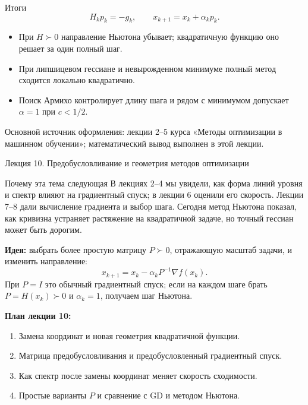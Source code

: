 \documentclass[aspectratio=169,10pt]{beamer}
\begin{document}
\begin{frame}{Итоги}
\small
\[
\boxed{H_kp_k=-g_k,\qquad x_{k+1}=x_k+\alpha_kp_k.}
\]
\begin{itemize}
\item При $H\succ0$ направление Ньютона убывает; квадратичную функцию оно решает за один полный шаг.
\item При липшицевом гессиане и невырожденном минимуме полный метод сходится локально квадратично.
\item Поиск Армихо контролирует длину шага и рядом с минимумом допускает $\alpha=1$ при $c<1/2$.
\end{itemize}
\vspace{.4em}
\footnotesize Основной источник оформления: лекции 2--5 курса «Методы оптимизации в машинном обучении»; математический вывод выполнен в этой лекции.
\end{frame}

\begin{frame}{Лекция 10. Предобусловливание и геометрия методов оптимизации}
\footnotesize
\begin{block}{Почему эта тема следующая}
В лекциях 2--4 мы увидели, как форма линий уровня и спектр влияют на градиентный спуск; в лекции 6 оценили его скорость. Лекции 7--8 дали вычисление градиента и выбор шага. Сегодня метод Ньютона показал, как кривизна устраняет растяжение на квадратичной задаче, но точный гессиан может быть дорогим.
\end{block}
\textbf{Идея:} выбрать более простую матрицу $P\succ0$, отражающую масштаб задачи, и изменить направление:
\[
\boxed{x_{k+1}=x_k-\alpha_k P^{-1}\nabla f(x_k).}
\]
При $P=I$ это обычный градиентный спуск; если на каждом шаге брать $P=H(x_k)\succ0$ и $\alpha_k=1$, получаем шаг Ньютона.
\par\vspace{.4em}
\textbf{План лекции 10:}
\begin{enumerate}
\item Замена координат и новая геометрия квадратичной функции.
\item Матрица предобусловливания и предобусловленный градиентный спуск.
\item Как спектр после замены координат меняет скорость сходимости.
\item Простые варианты $P$ и сравнение с GD и методом Ньютона.
\end{enumerate}
\end{frame}
\end{document}
